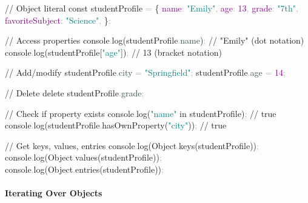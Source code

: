 \documentclass[
  justified,
  openright,
]{tufte-book}
\let\subsubsection\paragraph
\let\paragraph\paragraph
\newcommand{\AttributeTok}[1]{\textcolor{DarkSlateGray}{#1}}
\newcommand{\BuiltInTok}[1]{#1}
\newcommand{\CommentTok}[1]{\textcolor{MidGray}{#1}}
\newcommand{\DataTypeTok}[1]{\textcolor{Purple}{#1}}
\newcommand{\DecValTok}[1]{\textcolor{Purple}{#1}}
\newcommand{\FunctionTok}[1]{\textcolor{BrandBlue}{#1}}
\newcommand{\KeywordTok}[1]{\textcolor{BrandBlue}{#1}}
\newcommand{\NormalTok}[1]{#1}
\newcommand{\OperatorTok}[1]{\textcolor{DarkGray}{#1}}
\newcommand{\StringTok}[1]{\textcolor{Teal}{#1}}
\newenvironment{Shaded}{%
  \begin{snugshade}
}{%
  \end{snugshade}
}
\let\subsubsection\paragraph
\let\paragraph\paragraph
\begin{document}
\begin{Shaded}
\begin{Highlighting}[]
\CommentTok{// Object literal}
\KeywordTok{const}\NormalTok{ studentProfile }\OperatorTok{=}\NormalTok{ \{}
  \DataTypeTok{name}\OperatorTok{:} \StringTok{"Emily"}\OperatorTok{,}
  \DataTypeTok{age}\OperatorTok{:} \DecValTok{13}\OperatorTok{,}
  \DataTypeTok{grade}\OperatorTok{:} \StringTok{"7th"}\OperatorTok{,}
  \DataTypeTok{favoriteSubject}\OperatorTok{:} \StringTok{"Science"}\OperatorTok{,}
\NormalTok{\}}\OperatorTok{;}

\CommentTok{// Access properties}
\BuiltInTok{console}\OperatorTok{.}\FunctionTok{log}\NormalTok{(studentProfile}\OperatorTok{.}\AttributeTok{name}\NormalTok{)}\OperatorTok{;} \CommentTok{// "Emily" (dot notation)}
\BuiltInTok{console}\OperatorTok{.}\FunctionTok{log}\NormalTok{(studentProfile[}\StringTok{"age"}\NormalTok{])}\OperatorTok{;} \CommentTok{// 13 (bracket notation)}

\CommentTok{// Add/modify}
\NormalTok{studentProfile}\OperatorTok{.}\AttributeTok{city} \OperatorTok{=} \StringTok{"Springfield"}\OperatorTok{;}
\NormalTok{studentProfile}\OperatorTok{.}\AttributeTok{age} \OperatorTok{=} \DecValTok{14}\OperatorTok{;}

\CommentTok{// Delete}
\KeywordTok{delete}\NormalTok{ studentProfile}\OperatorTok{.}\AttributeTok{grade}\OperatorTok{;}

\CommentTok{// Check if property exists}
\BuiltInTok{console}\OperatorTok{.}\FunctionTok{log}\NormalTok{(}\StringTok{"name"} \KeywordTok{in}\NormalTok{ studentProfile)}\OperatorTok{;} \CommentTok{// true}
\BuiltInTok{console}\OperatorTok{.}\FunctionTok{log}\NormalTok{(studentProfile}\OperatorTok{.}\FunctionTok{hasOwnProperty}\NormalTok{(}\StringTok{"city"}\NormalTok{))}\OperatorTok{;} \CommentTok{// true}

\CommentTok{// Get keys, values, entries}
\BuiltInTok{console}\OperatorTok{.}\FunctionTok{log}\NormalTok{(}\BuiltInTok{Object}\OperatorTok{.}\FunctionTok{keys}\NormalTok{(studentProfile))}\OperatorTok{;}
\BuiltInTok{console}\OperatorTok{.}\FunctionTok{log}\NormalTok{(}\BuiltInTok{Object}\OperatorTok{.}\FunctionTok{values}\NormalTok{(studentProfile))}\OperatorTok{;}
\BuiltInTok{console}\OperatorTok{.}\FunctionTok{log}\NormalTok{(}\BuiltInTok{Object}\OperatorTok{.}\FunctionTok{entries}\NormalTok{(studentProfile))}\OperatorTok{;}
\end{Highlighting}
\end{Shaded}

\subsubsection{Iterating Over Objects}\label{iterating-over-objects}
\end{document}
